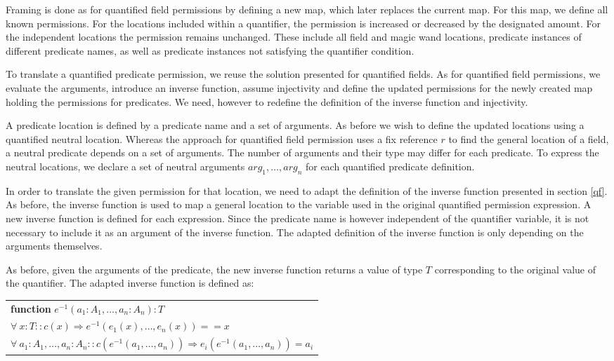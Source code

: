 \documentclass[12pt]{article}
\begin{document}
Framing is done as for quantified field permissions by defining a new map, which later replaces the current map. For this map, we define all known permissions. For the locations included within a quantifier, the permission is increased or decreased by the designated amount. For the independent locations the permission remains unchanged. These include all field and magic wand locations, predicate instances of different predicate names, as well as predicate instances not satisfying the quantifier condition.

To translate a quantified predicate permission, we reuse the solution presented for quantified fields. As for quantified field permissions, we evaluate the arguments, introduce an inverse function, assume injectivity and define the updated permissions for the newly created map holding the permissions for predicates. We need, however to redefine the definition of the inverse function and injectivity.

A predicate location is defined by a predicate name and a set of arguments. As before we wish to define the updated locations using a quantified neutral location. Whereas the approach for quantified field permission uses a fix reference \(r\) to find the general location of a field, a neutral predicate depends on a set of arguments. The number of arguments and their type may differ for each predicate. To express the neutral locations, we declare a set of neutral arguments \(arg_1, \dots, arg_n\) for each quantified predicate definition. 

In order to translate the given permission for that location, we need to adapt the definition of the inverse function presented in section \ref{qf}. As before, the inverse function is used to map a general location to the variable used in the original quantified permission expression. A new inverse function is defined for each expression. Since the predicate name is however independent of the quantifier variable, it is not necessary to include it as an argument of the inverse function. The adapted definition of the inverse function is only depending on the arguments themselves.

As before, given the arguments of the predicate, the new inverse function returns a value of type \(T\) corresponding to the original value of the quantifier. The adapted inverse function is defined as:\\

\begin{tabularx}{1\textwidth}{ X}
\textbf{function }\(e^{-1}(a_1:A_1, \dots, a_n:A_n): T\) \\
\(\forall \ x:T :: c(x) \Rightarrow e^{-1}(e_1 (x),…,e_n (x))==x \) \\
\( \forall \ a_1:A_1,\dots, a_n:A_n ::  c(e^{-1}(a_1, …,a_n )) \Rightarrow e_i (e^{-1}(a_1,\dots, a_n )) = a_i \) \\
\end{tabularx}\\
\end{document}

